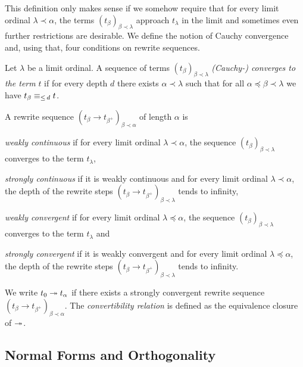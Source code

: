 This definition only makes sense if we somehow require that for every limit
ordinal $\lambda \prec \alpha$, the terms $(t_\beta)_{\beta \prec
  \lambda}$ approach $t_\lambda$ in the limit and sometimes even
further restrictions are desirable. We define the notion of Cauchy
convergence and, using that, four conditions on rewrite sequences.

\begin{definition}\label{def:cauchy}%
  Let $\lambda$ be a limit ordinal. A sequence of terms
  $(t_\beta)_{\beta \prec \lambda}$ \emph{(Cauchy-) converges to the
    term} $t$ if for every depth $d$ there exists $\alpha \prec
  \lambda$ such that for all $\alpha \preceq \beta \prec \lambda$ we
  have $t_\beta \equiv_{\le \, d} t$.
\end{definition}

\begin{definition}%
A rewrite sequence $(t_\beta \rightarrow t_{\beta^+})_{\beta \prec
  \alpha}$ of length $\alpha$ is
\begin{compactenum}
  \item
    \emph{weakly continuous} if for every limit ordinal $\lambda \prec
    \alpha$, the sequence $(t_\beta)_{\beta \prec \lambda}$ converges
    to the term $t_\lambda$,
  \item
    \emph{strongly continuous} if it is weakly continuous and for every limit
    ordinal $\lambda \prec \alpha$, the depth of the rewrite steps $(t_\beta
    \rightarrow t_{\beta^+})_{\beta \prec \lambda}$ tends to infinity,
  \item
    \emph{weakly convergent} if for every limit ordinal $\lambda
    \preceq \alpha$, the sequence $(t_\beta)_{\beta \prec \lambda}$
    converges to the term $t_\lambda$ and
  \item
    \emph{strongly convergent} if it is weakly convergent and for
    every limit ordinal $\lambda \preceq \alpha$, the depth of the
    rewrite steps $(t_\beta \rightarrow t_{\beta^+})_{\beta \prec
      \lambda}$ tends to infinity.
\end{compactenum}
\end{definition}

We write $t_0 \twoheadrightarrow t_\alpha$ if there exists a strongly
convergent rewrite sequence $(t_\beta \rightarrow t_{\beta^+})_{\beta
  \prec \alpha}$. The \emph{convertibility relation} is defined as the
equivalence closure of $\twoheadrightarrow$.


\subsection{Normal Forms and Orthogonality}

